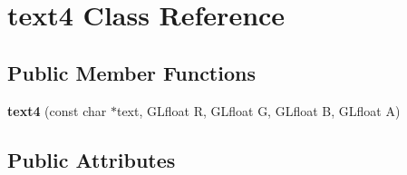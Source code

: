 \hypertarget{classtext4}{}\section{text4 Class Reference}
\label{classtext4}
\subsection*{Public Member Functions}
\begin{DoxyCompactItemize}
\item 
\mbox{\label{classtext4_a2b9a70244dbf82a0ff7dc6561a4cb4e5}} 
{\bfseries text4} (const char $\ast$text, G\+Lfloat R, G\+Lfloat G, G\+Lfloat B, G\+Lfloat A)
\end{DoxyCompactItemize}
\subsection*{Public Attributes}
